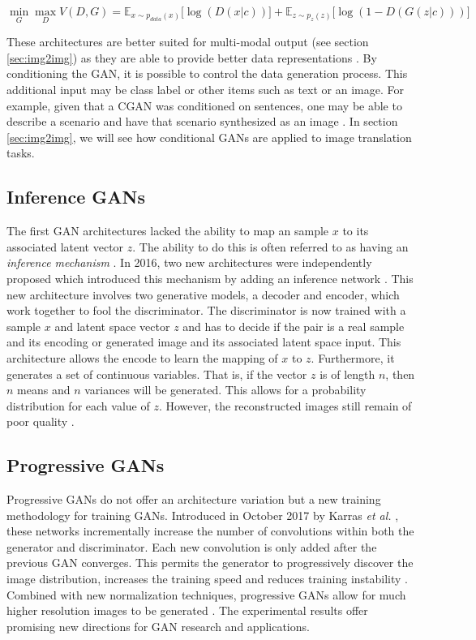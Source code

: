 \documentclass[11pt]{article}
\begin{document}
$$\min_{G}\max_{D}V(D, G) = \mathbb{E}_{x\sim p_{data}(x)}\Big[\log(D(x|c))\Big] + \mathbb{E}_{z\sim p_z(z)}\Big[\log(1-D(G(z|c)))\Big]$$

These architectures are better suited for multi-modal output (see section \ref{sec:img2img}) as they are able to provide better data representations \citep{2017arXiv171007035C}. By conditioning the GAN, it is possible to control the data generation process. This additional input may be class label or other items such as text or an image. For example, given that a CGAN was conditioned on sentences, one may be able to describe a scenario and have that scenario synthesized as an image \citep{2016arXiv160505396R}. In section \ref{sec:img2img}, we will see how conditional GANs are applied to image translation tasks.

\subsection{Inference GANs} \label{sec:inferencegan}
The first GAN architectures lacked the ability to map an sample $x$ to its associated latent vector $z$. The ability to do this is often referred to as having an \textit{inference mechanism} \citep{2017arXiv171007035C}. In 2016, two new architectures were independently proposed which introduced this mechanism by adding an inference network \citep{2016arXiv160509782D, 2016arXiv160600704D}. This new architecture involves two generative models, a decoder and encoder, which work together to fool the discriminator. The discriminator is now trained with a sample $x$ and latent space vector $z$ and has to decide if the pair is a real sample and its encoding or generated image and its associated latent space input. This architecture allows the encode to learn the mapping of $x$ to $z$. Furthermore, it generates a set of continuous variables. That is, if the vector $z$ is of length $n$, then $n$ means and $n$ variances will be generated. This allows for a probability distribution for each value of $z$. However, the reconstructed images still remain of poor quality \citep{2017arXiv171007035C}.

\subsection{Progressive GANs} \label{sec:proggans}
Progressive GANs do not offer an architecture variation but a new training methodology for training GANs. Introduced in October 2017 by Karras \textit{et al.} \citep{2017arXiv171010196K}, these networks incrementally increase the number of convolutions within both the generator and discriminator. Each new convolution is only added after the previous GAN converges. This permits the generator to progressively discover the image distribution, increases the training speed and reduces training instability \citep{2017arXiv171010196K}. Combined with new normalization techniques, progressive GANs allow for much higher resolution images to be generated \citep{2017arXiv171010196K}. The experimental results offer promising new directions for GAN research and applications.
\end{document}
